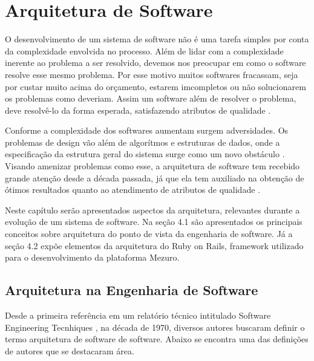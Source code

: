 \chapter{Arquitetura de Software}



O desenvolvimento de um sistema de software não é uma tarefa simples por conta da complexidade envolvida no processo. Além de lidar com a complexidade inerente ao problema a ser resolvido, devemos nos preocupar em como o software resolve esse mesmo problema. Por esse motivo muitos softwares fracassam, seja por custar muito acima do orçamento, estarem imcompletos ou não solucionarem os problemas como deveriam. Assim um software além de resolver o problema, deve resolvê-lo da forma esperada, satisfazendo atributos de qualidade \cite{germoglio2010fundamentos}.

Conforme a complexidade dos softwares aumentam surgem adversidades. Os problemas de design vão além de algorítmos e estruturas de dados, onde a especificação da estrutura geral do sistema surge como um novo obstáculo \cite{garlan1993introduction}. Visando amenizar problemas como esse, a arquitetura de software tem recebido grande atenção  desde a década passada, já que ela tem auxiliado na obtenção de ótimos resultados quanto ao atendimento de atributos de qualidade \cite{tese_prof_fabricio}. 

Neste capítulo serão apresentados aspectos da arquitetura, relevantes durante a evolução de um sistema de software. Na seção 4.1 são apresentados os principais conceitos sobre arquitetura do ponto de vista da engenharia de software. Já a seção 4.2 expõe elementos da arquitetura do Ruby on Rails, framework utilizado para o desenvolvimento da plataforma Mezuro.

\section{Arquitetura na Engenharia de Software}

Desde a primeira referência em um relatório técnico intitulado Software Engineering Tecnhiques \cite{buxton1970software}, na década de 1970, diversos autores buscaram definir o termo arquitetura de software de software. Abaixo se encontra uma das definições de autores que se destacaram área.

